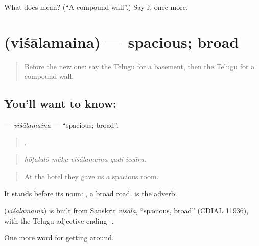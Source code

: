 \begin{tcolorbox}[breakable,colback=teal!4,colframe=teal!35!black,title={Before you move on}]
What does  mean? (\textquotedblleft{}A compound wall\textquotedblright{}.) Say it once more.
\end{tcolorbox}
\section[\texorpdfstring{\te{విశాలమైన} (viśālamaina)}{విశాలమైన (viśālamaina)}]{ (viśālamaina) — spacious; broad}

\label{lesson:TE-C467-visalamaina}



\begin{quote}
Before the new one: say the Telugu for a basement, then the Telugu for a compound wall.
\end{quote}

\subsection*{You'll want to know: }
\textbf{} — \emph{viśālamaina} — \textquotedblleft{}spacious; broad\textquotedblright{}.

\begin{quote}
    .
\end{quote}

\begin{quote}
\emph{hōṭalulō māku viśālamaina gadi iccāru.}
\end{quote}

\begin{quote}
At the hotel they gave us a spacious room.
\end{quote}

It stands before its noun:  , a broad road.  is the adverb.

\begin{cousinweb}
\textbf{} (\emph{viśālamaina}) is built from Sanskrit \emph{viśāla}, \textquotedblleft{}spacious, broad\textquotedblright{} (CDIAL 11936), with the Telugu adjective ending -.
\end{cousinweb}

\begin{grammarlens}[title={What you've built}]
One more word for getting around.
\end{grammarlens}

